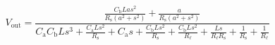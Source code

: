 \begin{equation}
V_{\mathrm{out}} = \frac{\frac{C_{\mathrm{b}} L a s^{2}}{R_{\mathrm{s}} \left(a^{2} + s^{2}\right)} + \frac{a}{R_{\mathrm{s}} \left(a^{2} + s^{2}\right)}}{C_{\mathrm{a}} C_{\mathrm{b}} L s^{3} + \frac{C_{\mathrm{a}} L s^{2}}{R_{\mathrm{s}}} + C_{\mathrm{a}} s + \frac{C_{\mathrm{b}} L s^{2}}{R_{\mathrm{s}}} + \frac{C_{\mathrm{b}} L s^{2}}{R_{\ell}} + \frac{L s}{R_{\ell} R_{\mathrm{s}}} + \frac{1}{R_{\mathrm{s}}} + \frac{1}{R_{\ell}}}
\end{equation}


